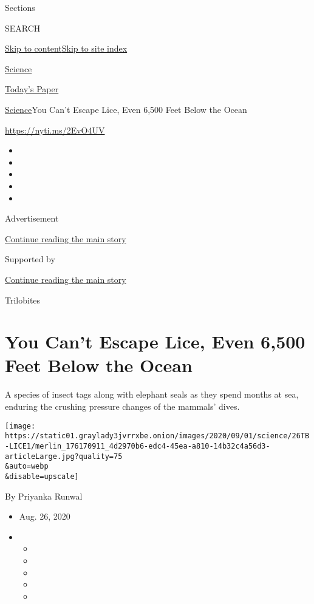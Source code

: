 Sections

SEARCH

\protect\hyperlink{site-content}{Skip to
content}\protect\hyperlink{site-index}{Skip to site index}

\href{https://www.nytimes3xbfgragh.onion/section/science}{Science}

\href{https://myaccount.nytimes3xbfgragh.onion/auth/login?response_type=cookie\&client_id=vi}{}

\href{https://www.nytimes3xbfgragh.onion/section/todayspaper}{Today's
Paper}

\href{/section/science}{Science}\textbar{}You Can't Escape Lice, Even
6,500 Feet Below the Ocean

\url{https://nyti.ms/2EvO4UV}

\begin{itemize}
\item
\item
\item
\item
\item
\end{itemize}

Advertisement

\protect\hyperlink{after-top}{Continue reading the main story}

Supported by

\protect\hyperlink{after-sponsor}{Continue reading the main story}

Trilobites

\hypertarget{you-cant-escape-lice-even-6500-feet-below-the-ocean}{%
\section{You Can't Escape Lice, Even 6,500 Feet Below the
Ocean}\label{you-cant-escape-lice-even-6500-feet-below-the-ocean}}

A species of insect tags along with elephant seals as they spend months
at sea, enduring the crushing pressure changes of the mammals' dives.

\texttt{[image: https://static01.graylady3jvrrxbe.onion/images/2020/09/01/science/26TB-LICE1/merlin\_176170911\_4d2970b6-edc4-45ea-a810-14b32c4a56d3-articleLarge.jpg?quality=75\\\&auto=webp\\\&disable=upscale]}

By Priyanka Runwal

\begin{itemize}
\item
  Aug. 26, 2020
\item
  \begin{itemize}
  \item
  \item
  \item
  \item
  \item
  \end{itemize}
\end{itemize}

